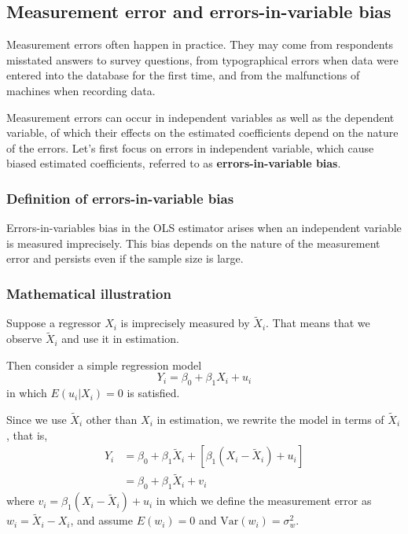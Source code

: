 \documentclass[a4paper,11pt]{article}
\newcommand{\var}{\mathrm{Var}}
\begin{document}
\subsection{Measurement error and errors-in-variable bias}
\label{sec:org15958b9}
Measurement errors often happen in practice. They may come from
respondents misstated answers to survey questions, from typographical
errors when data were entered into the database for the first time,
and from the malfunctions of machines when recording data. 

Measurement errors can occur in independent variables as well as the
dependent variable, of which their effects on the estimated
coefficients depend on the nature of the errors. Let's first focus on
errors in independent variable, which cause biased estimated
coefficients, referred to as \textbf{errors-in-variable bias}.

\subsubsection*{Definition of errors-in-variable bias}
\label{sec:orgf5af312}
Errors-in-variables bias in the OLS estimator arises when an
independent variable is measured imprecisely. This bias depends on the
nature of the measurement error and persists even if the sample size
is large.

\subsubsection*{Mathematical illustration}
\label{sec:org6e45f34}

Suppose a regressor \(X_i\) is imprecisely measured by
\(\tilde{X}_i\). That means that we observe \(\tilde{X}_i\) and use it in
estimation. 

Then consider a simple regression model 
\[ Y_i = \beta_0 + \beta_1 X_i + u_i  \]
in which \(E(u_i | X_i) = 0\) is satisfied. 

Since we use \(\tilde{X}_i\) other than \(X_i\) in estimation, we
rewrite the model in terms of \(\tilde{X}_i\), that is,
\begin{equation}
\begin{split}
Y_i &= \beta_0 + \beta_1 \tilde{X}_i + [\beta_1 (X_i - \tilde{X}_i) + u_i] \\
    &= \beta_0 + \beta_1 \tilde{X}_i + v_i \label{eq:err-in-var}
\end{split}
\end{equation}
where \(v_i = \beta_1(X_i - \tilde{X}_i) + u_i\) in which we define the
measurement error as \(w_i = \tilde{X}_i - X_i\), and assume \(E(w_i) =
0\) and \(\var(w_i) = \sigma^2_w\). 
\end{document}
